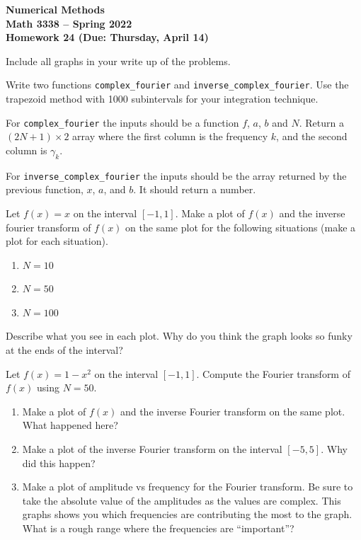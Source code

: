 \documentclass[11pt,letterpaper]{article}
\newcommand{\semester}{Spring 2022}
\newcommand{\due}{Thursday, April 14}
\begin{document}
\newpage

\begin{center}
{\huge{\bf  Numerical Methods}} \\[1.5ex]
{\bf Math 3338 -- \semester}\\[1.5ex]
{\Large{\bf Homework 24 (Due: \due)}}\\
\end{center}
\vspace{2mm}

Include all graphs in your write up of the problems.


\begin{problem}
Write two functions \texttt{complex\_fourier} and \texttt{inverse\_complex\_fourier}. Use
the trapezoid method with 1000 subintervals for your integration technique.

For \texttt{complex\_fourier} the inputs should be a function $f$, $a$, $b$ and $N$. Return a
$(2N+1)\times 2$ array where the first column is the frequency $k$, and the second column is $\gamma_k$.


For \texttt{inverse\_complex\_fourier} the inputs should be the array returned by the previous function,
$x$, $a$, and $b$. It should return a number.
\end{problem}


\begin{problem}
 Let $f(x) = x$ on the interval $[-1,1]$. Make a plot of $f(x)$ and the inverse fourier transform of 
$f(x)$ on the same plot for the following situations (make a plot for each situation).
\begin{enumerate}
 \item $N=10$
 \item $N=50$
 \item $N=100$
\end{enumerate}
Describe what you see in each plot. Why do you think the graph looks so funky at the ends of the
interval?

\end{problem}


\begin{problem}
 Let $f(x) = 1-x^2$ on the interval $[-1,1]$. Compute the Fourier transform of $f(x)$ using $N=50$.
\begin{enumerate}
 \item Make a plot of $f(x)$ and the inverse Fourier transform on the same plot. What happened here?
 \item Make a plot of the inverse Fourier transform on the interval $[-5,5]$. Why did this happen?
 \item Make a plot of amplitude vs frequency for the Fourier transform. Be sure to take the absolute
value of the amplitudes as the values are complex. This graphs shows you which frequencies are 
contributing the most to the graph. What is a rough range where the frequencies are ``important''?
\end{enumerate}
\end{problem}
\end{document}

